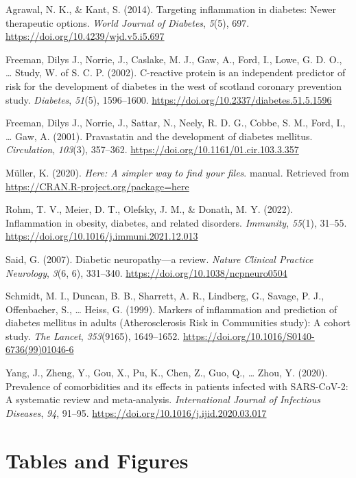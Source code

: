 \documentclass[
  man]{apa6}
\newlength{\cslhangindent}
\newlength{\cslentryspacingunit} %
\newenvironment{CSLReferences}[2] %
 {%
  \setlength{\parindent}{0pt}
  \ifodd #1
  \let\oldpar\par
  \def\par{\hangindent=\cslhangindent\oldpar}
  \fi
  \setlength{\parskip}{#2\cslentryspacingunit}
 }%
 {}
\begin{document}
\hypertarget{refs}{}
\begin{CSLReferences}{1}{0}
\leavevmode{}%
Agrawal, N. K., \& Kant, S. (2014). Targeting inflammation in diabetes: {Newer} therapeutic options. \emph{World Journal of Diabetes}, \emph{5}(5), 697. \url{https://doi.org/10.4239/wjd.v5.i5.697}

\leavevmode{}%
Freeman, Dilys J., Norrie, J., Caslake, M. J., Gaw, A., Ford, I., Lowe, G. D. O., \ldots{} Study, W. of S. C. P. (2002). C-reactive protein is an independent predictor of risk for the development of diabetes in the west of scotland coronary prevention study. \emph{Diabetes}, \emph{51}(5), 1596--1600. \url{https://doi.org/10.2337/diabetes.51.5.1596}

\leavevmode{}%
Freeman, Dilys J., Norrie, J., Sattar, N., Neely, R. D. G., Cobbe, S. M., Ford, I., \ldots{} Gaw, A. (2001). Pravastatin and the development of diabetes mellitus. \emph{Circulation}, \emph{103}(3), 357--362. \url{https://doi.org/10.1161/01.cir.103.3.357}

\leavevmode{}%
Müller, K. (2020). \emph{Here: {A} simpler way to find your files}. manual. Retrieved from \url{https://CRAN.R-project.org/package=here}

\leavevmode{}%
Rohm, T. V., Meier, D. T., Olefsky, J. M., \& Donath, M. Y. (2022). Inflammation in obesity, diabetes, and related disorders. \emph{Immunity}, \emph{55}(1), 31--55. \url{https://doi.org/10.1016/j.immuni.2021.12.013}

\leavevmode{}%
Said, G. (2007). Diabetic neuropathy---a review. \emph{Nature Clinical Practice Neurology}, \emph{3}(6, 6), 331--340. \url{https://doi.org/10.1038/ncpneuro0504}

\leavevmode{}%
Schmidt, M. I., Duncan, B. B., Sharrett, A. R., Lindberg, G., Savage, P. J., Offenbacher, S., \ldots{} Heiss, G. (1999). Markers of inflammation and prediction of diabetes mellitus in adults ({Atherosclerosis Risk} in {Communities} study): A cohort study. \emph{The Lancet}, \emph{353}(9165), 1649--1652. \url{https://doi.org/10.1016/S0140-6736(99)01046-6}

\leavevmode{}%
Yang, J., Zheng, Y., Gou, X., Pu, K., Chen, Z., Guo, Q., \ldots{} Zhou, Y. (2020). Prevalence of comorbidities and its effects in patients infected with {SARS-CoV-2}: A systematic review and meta-analysis. \emph{International Journal of Infectious Diseases}, \emph{94}, 91--95. \url{https://doi.org/10.1016/j.ijid.2020.03.017}

\end{CSLReferences}

\newpage

\hypertarget{tables-and-figures}{%
\section{Tables and Figures}\label{tables-and-figures}}


\clearpage
\renewcommand{\listfigurename}{Figure captions}

\clearpage
\renewcommand{\listtablename}{Table captions}
\end{document}
